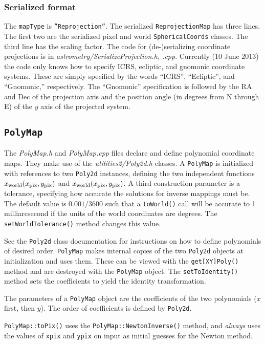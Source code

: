 \documentclass[11pt,preprint,flushrt]{aastex}
\begin{document}
\subsubsection{Serialized format}
The {\tt mapType} is {\tt ''Reprojection''}.
The serialized {\tt ReprojectionMap} has three lines.  The first two are the serialized pixel and world {\tt SphericalCoords} classes.  The third line has the scaling factor.  The code for (de-)serializing coordinate projections is in {\it astrometry/SerializeProjection.h, .cpp}.  Currently (10 June 2013) the code only knows how to specify ICRS, ecliptic, and gnomonic coordinate systems.  These are simply specified by the words ``ICRS'', ``Ecliptic'', and ``Gnomonic,'' respectively.  The ``Gnomonic'' specification is followed by the RA and Dec of the projection axis and the position angle (in degrees from N through E) of the $y$ axis of the projected system.

\subsection{{\tt PolyMap}}
The {\it PolyMap.h} and {\it PolyMap.cpp} files declare and define polynomial coordinate maps.  They make use of the {\it utilities2/Poly2d.h} classes.  A {\tt PolyMap} is initialized with references to two {\tt Poly2d} instances, defining the two independent functions $x_{\rm world}(x_{\rm pix},y_{\rm pix})$  and $x_{\rm world}(x_{\rm pix},y_{\rm pix})$.  A third construction parameter is a tolerance, specifying how accurate the solutions for inverse mappings must be.  The default value is $0.001/3600$ such that a {\tt toWorld()} call will be accurate to 1 milliarcsecond if the units of the world coordinates are degrees.  The {\tt setWorldTolerance()} method changes this value.

See the {\tt Poly2d} class documentation for instructions on how to define polynomials of desired order.  {\tt PolyMap} makes internal copies of the two {\tt Poly2d} objects at initialization and uses them.  These can be viewed with the {\tt get[XY]Poly()} method and are destroyed with the {\tt PolyMap} object.  The {\tt setToIdentity()} method sets the coefficients to yield the identity transformation.

The parameters of a {\tt PolyMap} object are the coefficients of the two polynomials ($x$ first, then $y$).  The order of coefficients is defined by {\tt Poly2d}.

{\tt PolyMap::toPix()} uses the {\tt PolyMap::NewtonInverse()} method, and {\em always} uses the values of {\tt xpix} and {\tt ypix} on input as initial guesses for the Newton method.
\end{document}
